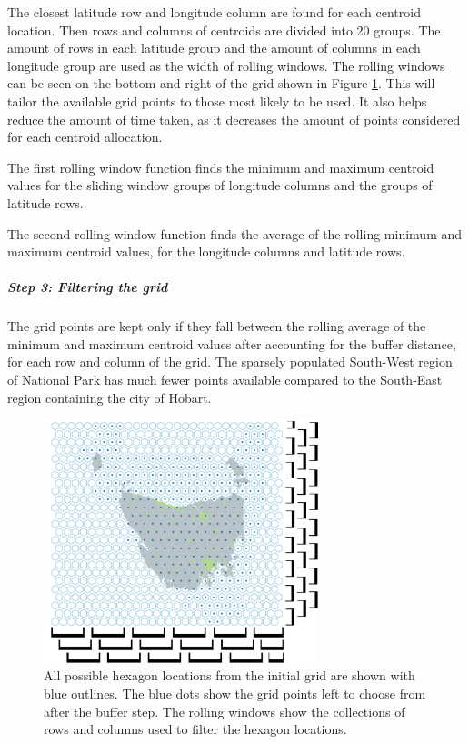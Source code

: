 \documentclass{monashthesis}
\begin{document}
The closest latitude row and longitude column are found for each centroid location. Then rows and columns of centroids are divided into 20 groups.
The amount of rows in each latitude group and the amount of columns in each longitude group are used as the width of rolling windows. The rolling windows can be seen on the bottom and right of the grid shown in Figure \ref{fig:filter-grid}.
This will tailor the available grid points to those most likely to be used.
It also helps reduce the amount of time taken, as it decreases the amount of points considered for each centroid allocation.

The first rolling window function finds the minimum and maximum centroid values for the sliding window groups of longitude columns and the groups of latitude rows.

The second rolling window function finds the average of the rolling minimum and maximum centroid values, for the longitude columns and latitude rows.

\hypertarget{step-3-filtering-the-grid}{%
\subparagraph{Step 3: Filtering the grid}\label{step-3-filtering-the-grid}}

The grid points are kept only if they fall between the rolling average of the minimum and maximum centroid values after accounting for the buffer distance, for each row and column of the grid. The sparsely populated South-West region of National Park has much fewer points available compared to the South-East region containing the city of Hobart.

\begin{figure}[H]
\centering
\includegraphics[width=8cm]{figures/03-algorithm/3grid.png}
\caption{\label{fig:filter-grid}All possible hexagon locations from the initial grid are shown with blue outlines. The blue dots show the grid points left to choose from after the buffer step. The rolling windows show the collections of rows and columns used to filter the hexagon locations.}
\end{figure}
\end{document}
